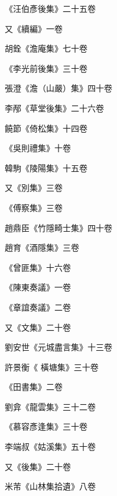 \begin{pinyinscope}
 《汪伯彥後集》二十五卷



 又《續編》一卷



 胡銓《澹庵集》七十卷



 《李光前後集》三十卷



 張澄《澹（山嚴）集》四十卷



 李邴《草堂後集》二十六卷



 饒節《倚松集》十四卷



 《吳則禮集》十卷



 韓駒《陵陽集》十五卷



 又《別集》三卷



 《傅察集》三卷



 趙鼎臣《竹隱畸士集》四十卷



 趙育《酒隱集》三卷



 《曾匪集》十六卷



 《陳東奏議》一卷



 《章誼奏議》二卷



 又《文集》二十卷



 劉安世《元城盡言集》十三卷



 許景衡《
 橫塘集》三十卷



 《田書集》二卷



 劉弇《龍雲集》三十二卷



 《慕容彥逢集》三十卷



 李端叔《姑溪集》五十卷



 又《後集》二十卷



 米芾《山林集拾遺》八卷




\end{pinyinscope}
